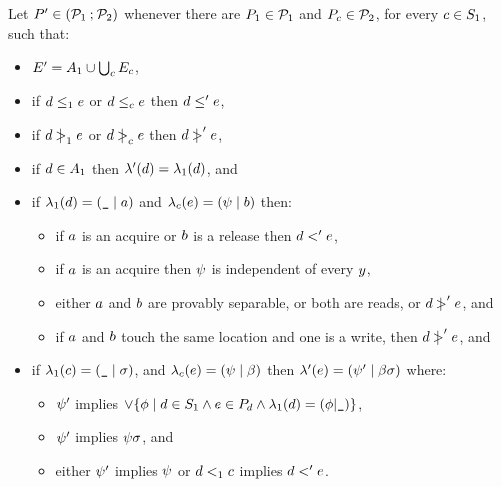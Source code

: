 \begin{definition}
  \label{def:semi:seq}
  Let $P' \in (\mathcal{P}_1 \mathbin; \mathcal{P}_2)$ whenever there are
  $P_1 \in \mathcal{P}_1$ and $P_{c}\in\mathcal{P}_2$, for every
  $c\in S_1$, such that:
\begin{itemize}
\item $E' = A_1 \cup \bigcup_{c}E_{c}$,
\item if $d \le_1 e$ or $d\le_{c} e$ then $d \le' e$,
\item if $d \mathrel{\,\mid\!\!\!>}_1 e$ or $d\mathrel{\,\mid\!\!\!>}_{c} e$ then $d \mathrel{\,\mid\!\!\!>}' e$,
\item if $d\in A_1$ then $\lambda'(d) = \lambda_1(d)$, and
\item if $\lambda_1(d) = (\texttt{\_} \mid a)$ and
  $\lambda_{c}(e) = (\psi \mid b)$ then:
  \begin{itemize}
  \item if $a$ is an acquire or $b$ is a release then $d <' e$,
  \item if $a$ is an acquire then $\psi$ is independent of every $y$,
  \item either $a$ and $b$ are provably separable, or both are reads, or
    $d \mathrel{\,\mid\!\!\!>}' e$, and
  \item if $a$ and $b$ touch the same location and one is a write,
    then $d \mathrel{\,\mid\!\!\!>}' e$, and
  \end{itemize}
\item 
  if
  $\lambda_1(c) = (\texttt{\_} \mid \sigma)$, and
  $\lambda_{c}(e) = (\psi \mid \beta)$ then
  $\lambda'(e) = (\psi' \mid \beta\sigma)$ where:
  \begin{itemize}
  \item $\psi'$ implies
    $\lor\{\phi\mid d\in S_1 \land e\in P\!_{d}
    \land \lambda_1(d)=(\phi{\mid}\texttt{\_})\}$,
  \item $\psi'$ implies $\psi\sigma$, and
  \item either $\psi'$ implies $\psi$ or $d<_1c$ implies $d<'e$.
  \end{itemize}
\end{itemize}
\end{definition}

\newpage

